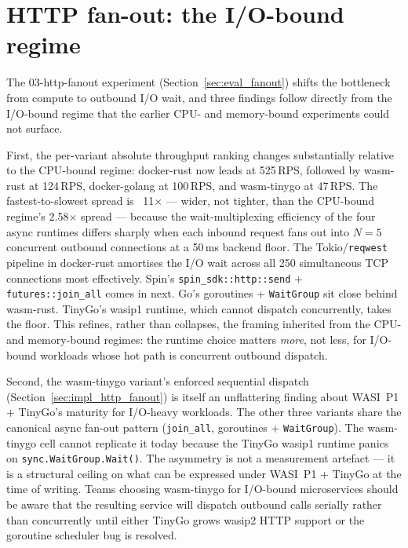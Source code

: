 \section{HTTP fan-out: the I/O-bound regime}
\label{sec:discussion_fanout}

The 03-http-fanout experiment (Section~\ref{sec:eval_fanout}) shifts the bottleneck from compute to outbound I/O wait, and three findings follow directly from the I/O-bound regime that the earlier CPU- and memory-bound experiments could not surface.

\begin{sloppypar}
First, the per-variant absolute throughput ranking changes substantially relative to the \acs{CPU}-bound regime: docker-rust now leads at 525\,RPS, followed by wasm-rust at 124\,RPS, docker-golang at 100\,RPS, and wasm-tinygo at 47\,RPS. The fastest-to-slowest spread is ~11$\times$ --- wider, not tighter, than the CPU-bound regime's 2.58$\times$ spread --- because the wait-multiplexing efficiency of the four async runtimes differs sharply when each inbound request fans out into $N=5$ concurrent outbound connections at a 50\,ms backend floor. The Tokio/\texttt{reqwest} pipeline in docker-rust amortises the I/O wait across all 250 simultaneous TCP connections most effectively. Spin's \texttt{spin\_sdk::http::send} + \texttt{futures::join\_all} comes in next. Go's goroutines + \texttt{WaitGroup} sit close behind wasm-rust. TinyGo's wasip1 runtime, which cannot dispatch concurrently, takes the floor. This refines, rather than collapses, the framing inherited from the CPU- and memory-bound regimes: the runtime choice matters \emph{more}, not less, for I/O-bound workloads whose hot path is concurrent outbound dispatch.
\end{sloppypar}

\begin{sloppypar}
Second, the wasm-tinygo variant's enforced sequential dispatch (Section~\ref{sec:impl_http_fanout}) is itself an unflattering finding about \acs{WASI}~P1 + TinyGo's maturity for I/O-heavy workloads. The other three variants share the canonical async fan-out pattern (\texttt{join\_all}, goroutines + \texttt{WaitGroup}). The wasm-tinygo cell cannot replicate it today because the TinyGo wasip1 runtime panics on \texttt{sync.WaitGroup.Wait()}. The asymmetry is not a measurement artefact --- it is a structural ceiling on what can be expressed under \acs{WASI}~P1 + TinyGo at the time of writing. Teams choosing wasm-tinygo for I/O-bound microservices should be aware that the resulting service will dispatch outbound calls serially rather than concurrently until either TinyGo grows wasip2 \acs{HTTP} support or the goroutine scheduler bug is resolved.
\end{sloppypar}

